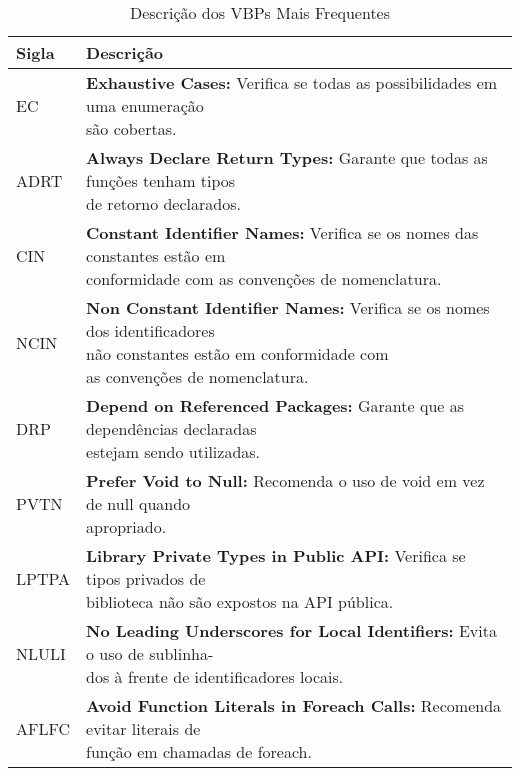 \documentclass[12pt]{article}
\begin{document}
\setlength{\extrarowheight}{3pt}
\begin{table}[H]
\centering
\caption{Descrição dos VBPs Mais Frequentes}
\label{tab:vbps_description}
\begin{tabularx}{\textwidth}{|>{\centering\arraybackslash}p{1.5cm}|X|}
\hline
\textbf{Sigla} & \textbf{Descrição} \\ \hline
EC & \makecell[l]{\textbf{Exhaustive Cases:} Verifica se todas as possibilidades em uma enumeração\\ são cobertas.} \\ \hline
ADRT & \makecell[l]{\textbf{Always Declare Return Types:} Garante que todas as funções tenham tipos\\ de retorno declarados.} \\ \hline
CIN & \makecell[l]{\textbf{Constant Identifier Names:} Verifica se os nomes das constantes estão em\\ conformidade com as convenções de nomenclatura.} \\ \hline
NCIN & \makecell[l]{\textbf{Non Constant Identifier Names:} Verifica se os nomes dos identificadores\\ não constantes estão em conformidade com\\ as convenções de nomenclatura.} \\ \hline
DRP & \makecell[l]{\textbf{Depend on Referenced Packages:} Garante que as dependências declaradas\\ estejam sendo utilizadas.} \\ \hline
PVTN & \makecell[l]{\textbf{Prefer Void to Null:} Recomenda o uso de void em vez de null quando\\ apropriado.} \\ \hline
LPTPA & \makecell[l]{\textbf{Library Private Types in Public API:} Verifica se tipos privados de\\ biblioteca não são expostos na API pública.} \\ \hline
NLULI & \makecell[l]{\textbf{No Leading Underscores for Local Identifiers:} Evita o uso de sublinha-\\dos à frente de identificadores locais.} \\ \hline
AFLFC & \makecell[l]{\textbf{Avoid Function Literals in Foreach Calls:} Recomenda evitar literais de\\ função em chamadas de foreach.} \\ \hline
\end{tabularx}
\end{table}
\end{document}
